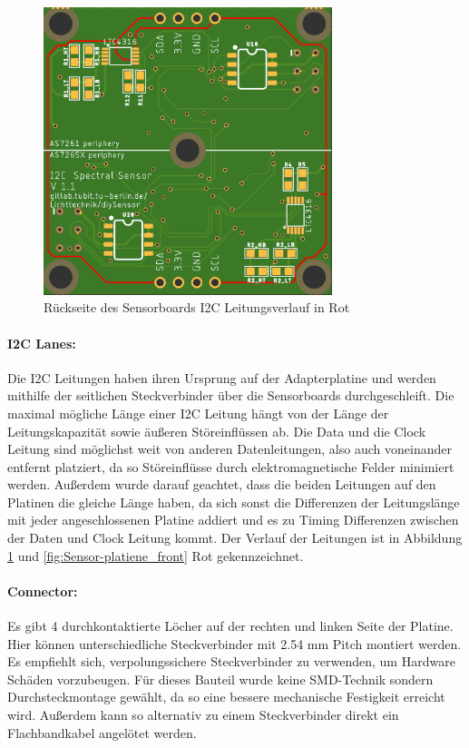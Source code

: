 \begin{figure}[H]
\centering
\includegraphics[width=0.75\textwidth]{img/Sensor-platiene_back}
\caption{Rückseite des Sensorboards I2C Leitungsverlauf in Rot}
\label{fig:Sensor-platiene_back}
\end{figure}

\paragraph{I2C Lanes:}
Die I2C Leitungen haben ihren Ursprung auf der Adapterplatine und werden mithilfe der seitlichen Steckverbinder über die Sensorboards durchgeschleift.
Die maximal mögliche Länge einer I2C Leitung hängt von der Länge der Leitungskapazität sowie äußeren Störeinflüssen ab.
Die Data und die Clock Leitung sind möglichst weit von anderen Datenleitungen, also auch voneinander entfernt platziert, da so Störeinflüsse durch elektromagnetische Felder minimiert werden.
Außerdem wurde darauf geachtet, dass die beiden Leitungen auf den Platinen die gleiche Länge haben, da sich sonst die Differenzen der Leitungslänge mit jeder angeschlossenen Platine addiert und es zu Timing Differenzen zwischen der Daten und Clock Leitung kommt.
Der Verlauf der Leitungen ist in Abbildung \ref{fig:Sensor-platiene_back} und \ref{fig:Sensor-platiene_front} Rot gekennzeichnet.

\paragraph{Connector:} Es gibt 4 durchkontaktierte Löcher auf der rechten und linken Seite der Platine. Hier können unterschiedliche Steckverbinder mit 2.54 mm Pitch montiert werden.
	Es empfiehlt sich, verpolungssichere Steckverbinder zu verwenden, um Hardware Schäden vorzubeugen.
	Für dieses Bauteil wurde keine SMD-Technik sondern Durchsteckmontage gewählt, da so eine bessere mechanische Festigkeit erreicht wird.
	Außerdem kann so alternativ zu einem Steckverbinder direkt ein Flachbandkabel angelötet werden.

